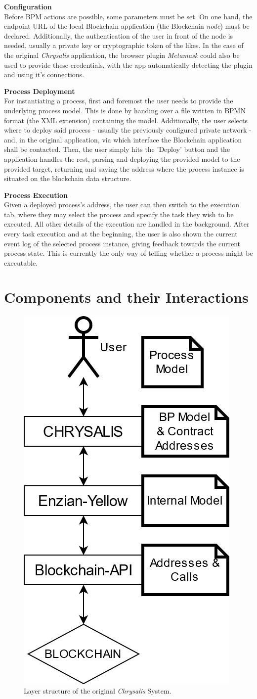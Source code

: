 \textbf{Configuration} \\[0.2em]
Before BPM actions are possible, some parameters must be set. On one hand, the endpoint URL of the local Blockchain application (the Blockchain \emph{node}) must be declared. Additionally, the authentication of the user in front of the node is needed, usually a private key or cryptographic token of the likes. In the case of the original \emph{Chrysalis} application, the browser plugin \emph{Metamask} could also be used to provide these credentials, with the app automatically detecting the plugin and using it's connections.

\textbf{Process Deployment} \\[0.2em]
For instantiating a process, first and foremost the user needs to provide the underlying process model. This is done by handing over a file written in BPMN format (the XML extension) containing the model. Additionally, the user selects where to deploy said process - usually the previously configured private network - and, in the original application, via which interface the Blockchain application shall be contacted. Then, the user simply hits the 'Deploy' button and the application handles the rest, parsing and deploying the provided model to the provided target, returning and saving the address where the process instance is situated on the blockchain data structure.

\textbf{Process Execution} \\[0.2em]
Given a deployed process's address, the user can then switch to the execution tab, where they may select the process and specify the task they wish to be executed. All other details of the execution are handled in the background. After every task execution and at the beginning, the user is also shown the current event log of the selected process instance, giving feedback towards the current process state. This is currently the only way of telling whether a process might be executable.

\section{Components and their Interactions}
\label{sec:init:components}


\begin{figure}[h]
	\centering
	\captionsetup{justification=centering,margin=2cm}
	\includegraphics[height=0.5\textwidth]{gfx/init-components-layers}
	\caption{Layer structure of the original \emph{Chrysalis} System.}
	\label{fig:init:components:layers}
\end{figure}

